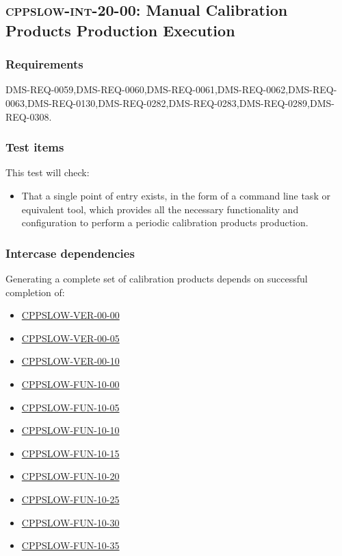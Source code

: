 \subsection{\textsc{cppslow-int-20-00}: Manual Calibration Products Production Execution}
\label{cppslow-int-20-00}

\subsubsection{Requirements}

DMS-REQ-0059,DMS-REQ-0060,DMS-REQ-0061,DMS-REQ-0062,DMS-REQ-0063,DMS-REQ-0130,DMS-REQ-0282,DMS-REQ-0283,DMS-REQ-0289,DMS-REQ-0308.

\subsubsection{Test items}

This test will check:

\begin{itemize}

  \item{That a single point of entry exists, in the form of a command line
  task or equivalent tool, which provides all the necessary functionality and
  configuration to perform a periodic calibration products production.}

\end{itemize}

\subsubsection{Intercase dependencies}

Generating a complete set of calibration products depends on successful
completion of:

\begin{itemize}

  \item{\hyperref[cppslow-ver-00-00]{CPPSLOW-VER-00-00}}
  \item{\hyperref[cppslow-ver-00-05]{CPPSLOW-VER-00-05}}
  \item{\hyperref[cppslow-ver-00-10]{CPPSLOW-VER-00-10}}
  \item{\hyperref[cppslow-fun-10-00]{CPPSLOW-FUN-10-00}}
  \item{\hyperref[cppslow-fun-10-05]{CPPSLOW-FUN-10-05}}
  \item{\hyperref[cppslow-fun-10-10]{CPPSLOW-FUN-10-10}}
  \item{\hyperref[cppslow-fun-10-15]{CPPSLOW-FUN-10-15}}
  \item{\hyperref[cppslow-fun-10-20]{CPPSLOW-FUN-10-20}}
  \item{\hyperref[cppslow-fun-10-25]{CPPSLOW-FUN-10-25}}
  \item{\hyperref[cppslow-fun-10-30]{CPPSLOW-FUN-10-30}}
  \item{\hyperref[cppslow-fun-10-35]{CPPSLOW-FUN-10-35}}

\end{itemize}

